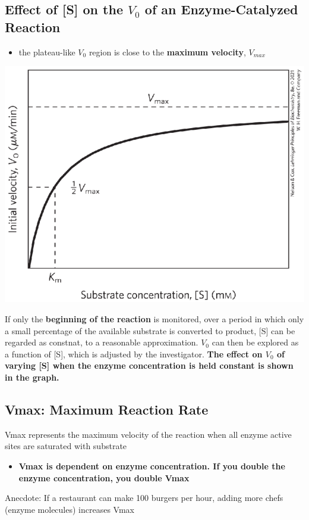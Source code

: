 \documentclass[10pt]{article}
\begin{document}
\subsection*{Effect of [S] on the $V_0$ of an Enzyme-Catalyzed Reaction}
\begin{itemize}
    \item the plateau-like $V_0$ region is close to the \textbf{maximum velocity}, $V_{max}$
\end{itemize}
\begin{center}
    \includegraphics*[scale=0.55]{L1_5.png}
\end{center}
If only the \textbf{beginning of the reaction} is monitored, over a period in which only a small percentage of the available substrate is converted to product, [S] can be regarded as constnat, to a reasonable approximation.  $V_0$ can then be explored as a function of [S], which is adjusted by the investigator.  \textbf{The effect on $V_0$ of varying [S] when the enzyme concentration is held constant is shown in the graph.}

\subsection*{Vmax: Maximum Reaction Rate}
Vmax represents the maximum velocity of the reaction when all enzyme active sites are saturated with substrate
\begin{itemize}
    \item \textbf{Vmax is dependent on enzyme concentration.  If you double the enzyme concentration, you double Vmax}
\end{itemize}
Anecdote: If a restaurant can make 100 burgers per hour, adding more chefs (enzyme molecules) increases Vmax
\end{document}
